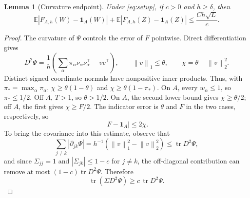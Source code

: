 \documentclass[11pt,letterpaper]{article}
\newtheorem{lemma}{Lemma}
\theoremstyle{remark}
\newcommand{\E}{\mathbb E}
\newcommand{\tr}{\operatorname{tr}}
\newcommand{\norm}[1]{\left\lVert#1\right\rVert}
\newcommand{\ind}{\mathbf 1}
\begin{document}
\begin{lemma}[Curvature endpoint]\label{appx-lem:endpoint-gap}
Under \eqref{eq:setup}, if \(c>0\) and \(h\ge\delta\), then
\begin{equation}
 \E|F_{A,h}(W)-\ind_A(W)|
 +\E|F_{A,h}(Z)-\ind_A(Z)|
 \le \frac{Ch\sqrt L}{c}.
 \label{appx-eq:endpoint-gap}
\end{equation}
\end{lemma}

\begin{proof}
The curvature of \(\Psi\) controls the error of \(F\) pointwise.
Direct differentiation gives
\begin{equation}
 D^2\Psi=\frac1h\left(
 \sum_\alpha\pi_\alpha\nu_\alpha\nu_\alpha^\top-vv^\top\right),
 \qquad \norm v_1\le\theta,\qquad
 \chi=\theta-\norm v_2^2.
 \label{appx-eq:hessian}
\end{equation}
Distinct signed coordinate normals have nonpositive inner products.
Thus, with \(\pi_* =\max_\alpha\pi_\alpha\),
\(\chi\ge\theta(1-\theta)\) and
\(\chi\ge\theta(1-\pi_*)\).
On \(A\), every \(w_\alpha\le1\), so \(\pi_*\le1/2\).
Off \(A\), \(T>1\), so \(\theta>1/2\). On \(A\), the second
lower bound gives \(\chi\ge\theta/2\); off \(A\), the first gives
\(\chi\ge F/2\). The indicator error is \(\theta\) and \(F\)
in the two cases, respectively, so
\begin{equation}
 |F-\ind_A|\le2\chi.
 \label{appx-eq:curvature-error}
\end{equation}
To bring the covariance into this estimate, observe that
\[
 \sum_{j\ne k}|\partial_{jk}\Psi|
 =h^{-1}(\norm v_1^2-\norm v_2^2)
 \le\tr D^2\Psi,
\]
and since \(\Sigma_{jj}=1\) and \(|\Sigma_{jk}|\le1-c\) for
\(j\ne k\), the off-diagonal contribution can remove at most
\((1-c)\tr D^2\Psi\). Therefore
\begin{equation}
 \tr(\Sigma D^2\Psi)\ge c\,\tr D^2\Psi.
 \label{appx-eq:gap-contraction}
\end{equation}


\end{proof}
\end{document}
